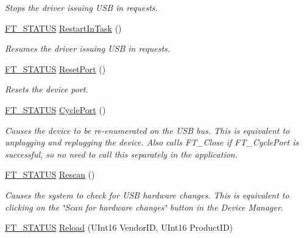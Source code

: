 \begin{DoxyCompactItemize}
\begin{DoxyCompactList}\small\item\em Stops the driver issuing U\+SB in requests. \end{DoxyCompactList}\item 
\mbox{\hyperlink{class_f_t_d2_x_x___n_e_t_1_1_f_t_d_i_aabe20ad905cc4ccc1e35dd5b877d9a83}{F\+T\+\_\+\+S\+T\+A\+T\+US}} \mbox{\hyperlink{class_f_t_d2_x_x___n_e_t_1_1_f_t_d_i_a14336dac93e815f0f6f447d1f02dc4fd}{Restart\+In\+Task}} ()
\begin{DoxyCompactList}\small\item\em Resumes the driver issuing U\+SB in requests. \end{DoxyCompactList}\item 
\mbox{\hyperlink{class_f_t_d2_x_x___n_e_t_1_1_f_t_d_i_aabe20ad905cc4ccc1e35dd5b877d9a83}{F\+T\+\_\+\+S\+T\+A\+T\+US}} \mbox{\hyperlink{class_f_t_d2_x_x___n_e_t_1_1_f_t_d_i_accb71a54d8a9463552e6cf471f1d905c}{Reset\+Port}} ()
\begin{DoxyCompactList}\small\item\em Resets the device port. \end{DoxyCompactList}\item 
\mbox{\hyperlink{class_f_t_d2_x_x___n_e_t_1_1_f_t_d_i_aabe20ad905cc4ccc1e35dd5b877d9a83}{F\+T\+\_\+\+S\+T\+A\+T\+US}} \mbox{\hyperlink{class_f_t_d2_x_x___n_e_t_1_1_f_t_d_i_a0cb5fd1904ca9d11fb70cbe0645557dd}{Cycle\+Port}} ()
\begin{DoxyCompactList}\small\item\em Causes the device to be re-\/enumerated on the U\+SB bus. This is equivalent to unplugging and replugging the device. Also calls F\+T\+\_\+\+Close if F\+T\+\_\+\+Cycle\+Port is successful, so no need to call this separately in the application. \end{DoxyCompactList}\item 
\mbox{\hyperlink{class_f_t_d2_x_x___n_e_t_1_1_f_t_d_i_aabe20ad905cc4ccc1e35dd5b877d9a83}{F\+T\+\_\+\+S\+T\+A\+T\+US}} \mbox{\hyperlink{class_f_t_d2_x_x___n_e_t_1_1_f_t_d_i_a939a869f6586eab80fff376bb857544b}{Rescan}} ()
\begin{DoxyCompactList}\small\item\em Causes the system to check for U\+SB hardware changes. This is equivalent to clicking on the \char`\"{}\+Scan for hardware changes\char`\"{} button in the Device Manager. \end{DoxyCompactList}\item 
\mbox{\hyperlink{class_f_t_d2_x_x___n_e_t_1_1_f_t_d_i_aabe20ad905cc4ccc1e35dd5b877d9a83}{F\+T\+\_\+\+S\+T\+A\+T\+US}} \mbox{\hyperlink{class_f_t_d2_x_x___n_e_t_1_1_f_t_d_i_ab95ea67e304fbd3fef1ddc64a5fb20df}{Reload}} (U\+Int16 Vendor\+ID, U\+Int16 Product\+ID)

\end{DoxyCompactItemize}
